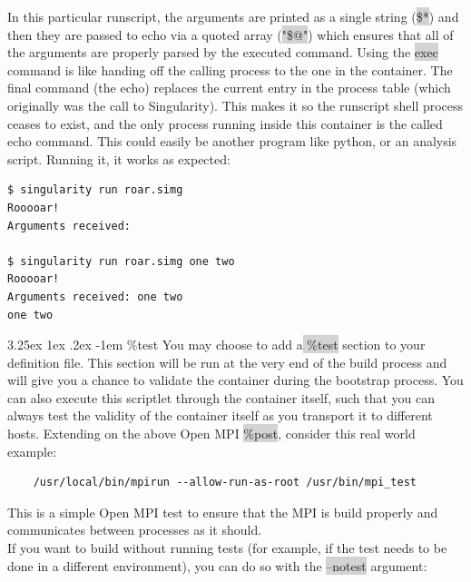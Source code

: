 \documentclass[a4paper]{article}
\makeatletter
\renewcommand\paragraph{\@startsection{paragraph}{5}{\z@}%
  {3.25ex \@plus1ex \@minus.2ex}%
  {-1em}%
  {\normalfont\normalsize\bfseries}}
\makeatother
\begin{document}
  In this particular runscript, the arguments are printed as a single string (\colorbox{lightgray}{\$*}) and then they are passed to echo via a quoted array (\colorbox{lightgray}{"\$@"}) which ensures that all of the arguments are properly parsed by the executed command. Using the \colorbox{lightgray}{exec} command is like handing off the calling process to the one in the container. The final command (the echo) replaces the current entry in the process table (which originally was the call to Singularity). This makes it so the runscript shell process ceases to exist, and the only process running inside this container is the called echo command. This could easily be another program like python, or an analysis script. Running it, it works as expected:
  
\begin{lstlisting}[frame=single] 
$ singularity run roar.simg 
Rooooar!
Arguments received: 

$ singularity run roar.simg one two
Rooooar!
Arguments received: one two
one two
\end{lstlisting}
		
\paragraph{\%test}
You may choose to add a\colorbox{lightgray}{ \%test} section to your definition file. This section will be run at the very end of the build process and will give you a chance to validate the container during the bootstrap process. You can also execute this scriptlet through the container itself, such that you can always test the validity of the container itself as you transport it to different hosts. Extending on the above Open MPI \colorbox{lightgray}{\%post}, consider this real world example:

\begin{lstlisting}[frame=single] 
%test
    /usr/local/bin/mpirun --allow-run-as-root /usr/bin/mpi_test
\end{lstlisting}


This is a simple Open MPI test to ensure that the MPI is build properly and communicates between processes as it should.\\[0.1in]

If you want to build without running tests (for example, if the test needs to be done in a different environment), you can do so with the \colorbox{lightgray}{ --notest} argument:\\[0.1in]
\end{document}
